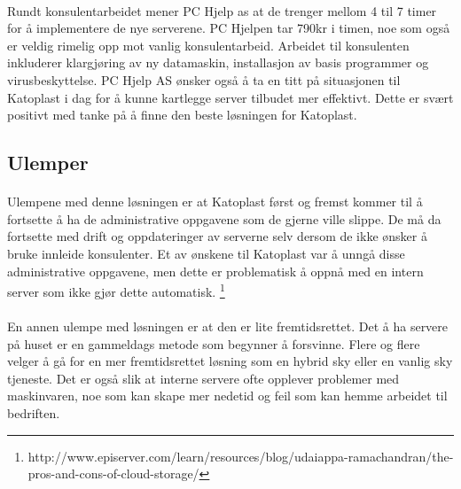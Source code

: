 \paragraph{} Rundt konsulentarbeidet mener PC Hjelp as at de trenger mellom 4 til 7 timer for å implementere de nye serverene. PC Hjelpen tar 790kr i timen, noe som også er veldig rimelig opp mot vanlig konsulentarbeid. Arbeidet til konsulenten inkluderer klargjøring av ny datamaskin, installasjon av basis programmer og virusbeskyttelse. PC Hjelp AS ønsker også å ta en titt på situasjonen til Katoplast i dag for å kunne kartlegge server tilbudet mer effektivt. Dette er svært positivt med tanke på å finne den beste løsningen for Katoplast.

\paragraph{} 

\subsection{Ulemper}

\paragraph{} Ulempene med denne løsningen er at Katoplast først og fremst kommer til å fortsette å ha de administrative oppgavene som de gjerne ville slippe. De må da fortsette med drift og oppdateringer av serverne selv dersom de ikke ønsker å bruke innleide konsulenter. Et av ønskene til Katoplast var å unngå disse administrative oppgavene, men dette er problematisk å oppnå med en intern server som ikke gjør dette automatisk. \footnote{http://www.episerver.com/learn/resources/blog/udaiappa-ramachandran/the-pros-and-cons-of-cloud-storage/}

\paragraph{} En annen ulempe med løsningen er at den er lite fremtidsrettet. Det å ha servere på huset er en gammeldags metode som begynner å forsvinne. Flere og flere velger å gå for en mer fremtidsrettet løsning som en hybrid sky eller en vanlig sky tjeneste. Det er også slik at interne servere ofte opplever problemer med maskinvaren, noe som kan skape mer nedetid og feil som kan hemme arbeidet til bedriften. 

